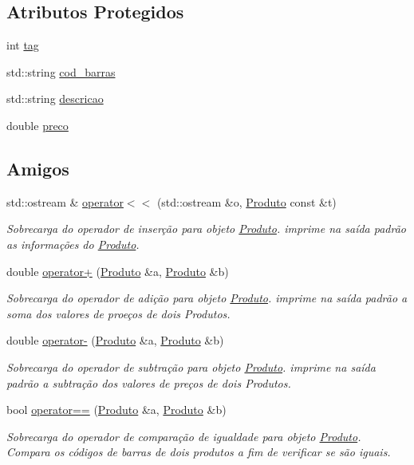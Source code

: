 \subsection*{Atributos Protegidos}
\begin{DoxyCompactItemize}
\item 
int \hyperlink{classProduto_a76711f92305c825f07549734cd7c6ade}{tag}
\item 
std\-::string \hyperlink{classProduto_a81dc2fcc260450b37524278699094f0b}{cod\-\_\-barras}
\item 
std\-::string \hyperlink{classProduto_ab04a024e24feb7f79774e280356f6bc7}{descricao}
\item 
double \hyperlink{classProduto_a2ad13f91582fd70e878fc449c7b77171}{preco}
\end{DoxyCompactItemize}
\subsection*{Amigos}
\begin{DoxyCompactItemize}
\item 
std\-::ostream \& \hyperlink{classProduto_a75e56b3684b7859fc15d147b7d27f6b0}{operator$<$$<$} (std\-::ostream \&o, \hyperlink{classProduto}{Produto} const \&t)
\begin{DoxyCompactList}\small\item\em Sobrecarga do operador de inserção para objeto \hyperlink{classProduto}{Produto}.  imprime na saída padrão as informações do \hyperlink{classProduto}{Produto}. \end{DoxyCompactList}\item 
double \hyperlink{classProduto_a13cc75bc264a9557efef0353b184d3e4}{operator+} (\hyperlink{classProduto}{Produto} \&a, \hyperlink{classProduto}{Produto} \&b)
\begin{DoxyCompactList}\small\item\em Sobrecarga do operador de adição para objeto \hyperlink{classProduto}{Produto}.  imprime na saída padrão a soma dos valores de proeços de dois Produtos. \end{DoxyCompactList}\item 
double \hyperlink{classProduto_af98881fb5c5587f7372a27edbe6bd808}{operator-\/} (\hyperlink{classProduto}{Produto} \&a, \hyperlink{classProduto}{Produto} \&b)
\begin{DoxyCompactList}\small\item\em Sobrecarga do operador de subtração para objeto \hyperlink{classProduto}{Produto}.  imprime na saída padrão a subtração dos valores de preços de dois Produtos. \end{DoxyCompactList}\item 
bool \hyperlink{classProduto_adf4b96b0581708b8aa8bb2932bac578a}{operator==} (\hyperlink{classProduto}{Produto} \&a, \hyperlink{classProduto}{Produto} \&b)
\begin{DoxyCompactList}\small\item\em Sobrecarga do operador de comparação de igualdade para objeto \hyperlink{classProduto}{Produto}.  Compara os códigos de barras de dois produtos a fim de verificar se são iguais. \end{DoxyCompactList}\end{DoxyCompactItemize}


